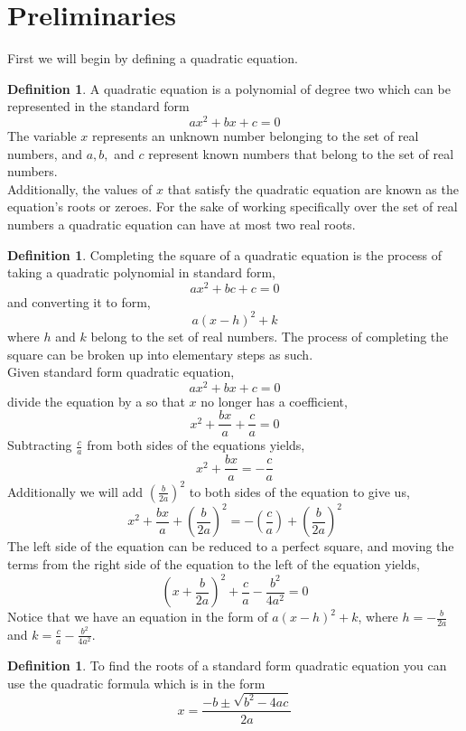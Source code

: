 \documentclass{article}
\theoremstyle{plain}
\theoremstyle{definition}
\newtheorem{defi}[thm]{Definition}
\begin{document}
\section{Preliminaries} \label{sect:prelims}
First we will begin by defining a quadratic equation.
    \begin{defi}\label{def:quadratic}
    A quadratic equation is a polynomial of degree two which can be represented in the standard form\hfill\\
    $$ax^2+bx+c=0$$
    The variable $x$ represents an unknown number belonging to the set of real numbers, and $a, b, $ and $c$ represent known numbers that belong to the set of real numbers.\\
    Additionally, the values of $x$ that satisfy the quadratic equation are known as the equation's roots or zeroes. For the sake of working specifically over the set of real numbers a quadratic equation can have at most two real roots.\\
    \end{defi}
    \begin{defi}\label{def:compSquare}
    Completing the square of a quadratic equation is the process of taking a quadratic polynomial in standard form,\\
    $$ax^2+bc+c=0$$
    and converting it to form,
    $$a(x-h)^2+k$$
    where $h$ and $k$ belong to the set of real numbers.
    The process of completing the square can be broken up into elementary steps as such.\\
    Given standard form quadratic equation, $$ax^2+bx+c=0$$
    divide the equation by a so that $x$ no longer has a coefficient, $$x^2+\frac{bx}{a}+\frac{c}{a}=0$$
    Subtracting $\frac{c}{a}$ from both sides of the equations yields, 
    $$x^2+\frac{bx}{a}=-\frac{c}{a}$$
    Additionally we will add $(\frac{b}{2a})^2$ to both sides of the equation to give us,
    $$x^2+\frac{bx}{a}+(\frac{b}{2a})^2= -(\frac{c}{a}) + (\frac{b}{2a})^2$$
    The left side of the equation can be reduced to a perfect square, and moving the terms from the right side of the equation to the left of the equation yields, 
    $$(x+\frac{b}{2a})^2+\frac{c}{a}-\frac{b^2}{4a^2}=0$$
    Notice that we have an equation in the form of $a(x-h)^2+k$, where $h = -\frac{b}{2a}$ and $k=\frac{c}{a} - \frac{b^2}{4a^2}$.
    \end{defi}
    \begin{defi}\label{def:quadraticEq}
    To find the roots of a standard form quadratic equation you can use the quadratic formula which is in the form
    $$x=\frac{-b\pm\sqrt{b^2-4ac}}{2a}$$
    \end{defi}
\end{document}
